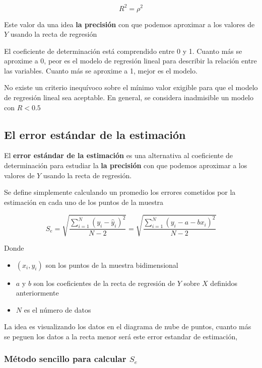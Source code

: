 \documentclass[
]{article}
\providecommand{\tightlist}{%
  \setlength{\itemsep}{0pt}\setlength{\parskip}{0pt}}
\begin{document}
\[R^2 = \rho ^2\]

Este valor da una idea \textbf{la precisión} con que podemos aproximar a
los valores de \(Y\) usando la recta de regresión

El coeficiente de determinación está comprendido entre 0 y 1. Cuanto más
se aproxime a 0, peor es el modelo de regresión lineal para describir la
relación entre las variables. Cuanto más se aproxime a 1, mejor es el
modelo.

No existe un criterio inequívoco sobre el mínimo valor exigible para que
el modelo de regresión lineal sea aceptable. En general, se considera
inadmisible un modelo con \(R<0.5\)

\hypertarget{el-error-estuxe1ndar-de-la-estimaciuxf3n}{%
\subsection{El error estándar de la
estimación}\label{el-error-estuxe1ndar-de-la-estimaciuxf3n}}

El \textbf{error estándar de la estimación} es una alternativa al
coeficiente de determinación para estudiar la \textbf{la precisión} con
que podemos aproximar a los valores de \(Y\) usando la recta de
regresión.

Se define simplemente calculando un promedio los errores cometidos por
la estimación en cada uno de los puntos de la muestra

\[S_e = \sqrt{\frac{\sum^N_{i=1} (y_i - \hat y_i)^2 }{N-2}} = \sqrt{\frac{\sum^N_{i=1} (y_i - a - bx_i)^2 }{N-2}} \]

Donde

\begin{itemize}
\tightlist
\item
  \((x_i, y_i)\) son los puntos de la muestra bidimensional
\item
  \(a\) y \(b\) son los coeficientes de la recta de regresión de \(Y\)
  sobre \(X\) definidos anteriormente
\item
  \(N\) es el número de datos
\end{itemize}

La idea es visualizando los datos en el diagrama de nube de puntos,
cuanto más se peguen los datos a la recta menor será este error estandar
de estimación,

\hypertarget{muxe9todo-sencillo-para-calcular-s_e}{%
\subsubsection{\texorpdfstring{Método sencillo para calcular
\(S_e\)}{Método sencillo para calcular S\_e}}\label{muxe9todo-sencillo-para-calcular-s_e}}
\end{document}

